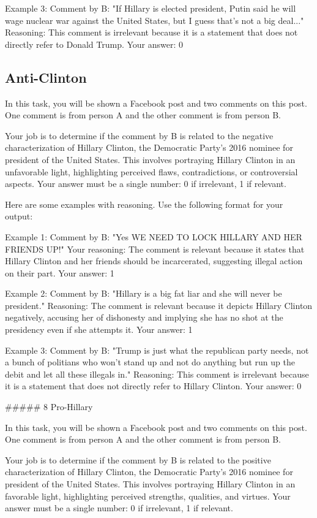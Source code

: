 Example 3:
Comment by B: "If Hillary is elected president, Putin said he will wage nuclear war against the United States, but I guess that's not a big deal..."
Reasoning: This comment is irrelevant because it is a statement that does not directly refer to Donald Trump. 
Your answer: 0

\subsection{Anti-Clinton}

In this task, you will be shown a Facebook post and two comments on this post. One comment is from person A and the other comment is from person B. 

Your job is to determine if the comment by B is related to the negative characterization of Hillary Clinton, the Democratic Party's 2016 nominee for president of the United States. This involves portraying Hillary Clinton in an unfavorable light, highlighting perceived flaws, contradictions, or controversial aspects.
Your answer must be a single number: 0 if irrelevant, 1 if relevant.

Here are some examples with reasoning. Use the following format for your output:

Example 1:
Comment by B: "Yes WE NEED TO LOCK HILLARY AND HER FRIENDS UP!"
Your reasoning: The comment is relevant because it states that Hillary Clinton and her friends should be incarcerated, suggesting illegal action on their part.
Your answer: 1

Example 2:
Comment by B: "Hillary is a big fat liar and she will never be president."
Reasoning: The comment is relevant because it depicts Hillary Clinton negatively, accusing her of dishonesty and implying she has no shot at the presidency even if she attempts it.
Your answer: 1

Example 3:
Comment by B: "Trump is just what the republican party needs, not a bunch of politians who won't stand up and not do anything but run up the debit and let all these illegals in."
Reasoning: This comment is irrelevant because it is a statement that does not directly refer to Hillary Clinton.
Your answer: 0

##### 8 Pro-Hillary

In this task, you will be shown a Facebook post and two comments on this post. One comment is from person A and the other comment is from person B. 

Your job is to determine if the comment by B is related to the positive characterization of Hillary Clinton, the Democratic Party's 2016 nominee for president of the United States. This involves portraying Hillary Clinton in an favorable light, highlighting perceived strengths, qualities, and virtues.
Your answer must be a single number: 0 if irrelevant, 1 if relevant.

